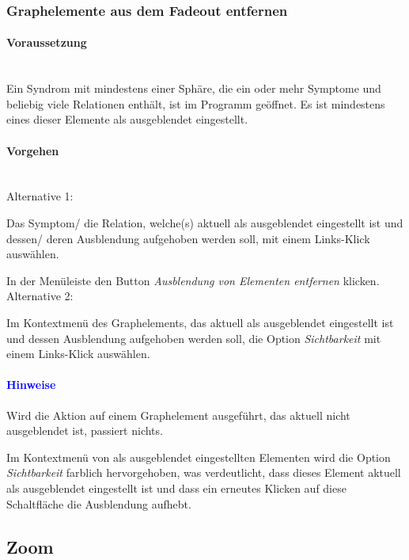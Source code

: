 \documentclass[enabledeprecatedfontcommands,fontsize=11pt,paper=a4,twoside]{scrartcl}
\newcounter{one}
\newcounter{two}[one]
\newcommand*{\hint}{\paragraph{\textcolor{blue}{Hinweise}}}
\newcommand*{\condition}{\paragraph{Voraussetzung}$\;$ \vspace{0.2cm}\\}
\newcommand*{\actions}{\paragraph{Vorgehen} $\;$\vspace{0.2cm}\\}
\newcommand*{\aOne}{\textcolor{bbe}{Alternative 1:}}
\newcommand*{\aTwo}{\textcolor{bbe}{Alternative 2:}}
\let\tempone\itemize
\let\temptwo\enditemize
\renewenvironment{itemize}{\tempone\addtolength{\itemsep}{-10.0pt}}{\temptwo}
\let\origenumerate\enumerate
\let\origendenumerate\endenumerate
\renewenvironment{enumerate}{\origenumerate \addtolength{\itemsep}{-10.0pt}}{\origendenumerate}
\begin{document}
\subsubsection{Graphelemente aus dem Fadeout entfernen}
		\condition 	
		Ein Syndrom mit mindestens einer Sphäre, die ein oder mehr Symptome und beliebig viele Relationen enthält, ist im Programm geöffnet. Es ist mindestens eines dieser Elemente als ausgeblendet eingestellt.
		\actions
		\aOne
		\begin{enumerate}
			\item Das Symptom/ die Relation, welche(s) aktuell als ausgeblendet eingestellt ist und dessen/ deren Ausblendung aufgehoben werden soll, mit einem Links-Klick auswählen. 
			\item In der Menüleiste den Button \textit{Ausblendung von Elementen entfernen} klicken.
		\end{enumerate}
		\aTwo
		\begin{enumerate}
			\item Im Kontextmenü des Graphelements, das aktuell als ausgeblendet eingestellt ist und dessen Ausblendung aufgehoben werden soll, die Option \textit{Sichtbarkeit} mit einem Links-Klick auswählen.
		\end{enumerate}
		\hint
		\begin{itemize}
				\item Wird die Aktion auf einem Graphelement ausgeführt, das aktuell nicht ausgeblendet ist, passiert nichts.
				\item Im Kontextmenü von als ausgeblendet eingestellten Elementen wird die Option \textit{Sichtbarkeit} farblich hervorgehoben, was verdeutlicht, dass dieses Element aktuell als ausgeblendet eingestellt ist und dass ein erneutes Klicken auf diese Schaltfläche die Ausblendung aufhebt.\\
		\end{itemize}	
		

\subsection{Zoom} \label{zoom}
\end{document}
